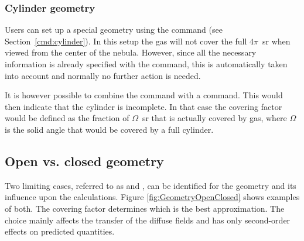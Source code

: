 \subsubsection{Cylinder geometry}
\label{cov_cylinder}

Users can set up a special geometry using the  command
(see Section~\ref{cmd:cylinder}). In this setup the gas will not cover the
full $4\pi$~sr when viewed from the center of the nebula. However, since all
the necessary information is already specified with the 
command, this is automatically taken into account and normally no further
action is needed.

It is however possible to combine the  command with a
 command. This would then indicate that the
cylinder is incomplete. In that case the covering factor would be defined as
the fraction of $\Omega$~sr that is actually covered by gas, where $\Omega$
is the solid angle that would be covered by a full cylinder.

\subsection{Open vs. closed geometry}
\label{sec:GeometryOpenClosed}

Two limiting cases, referred to as  and , can be identified
for the geometry and its influence upon the calculations.
Figure \ref{fig:GeometryOpenClosed} shows
examples of both.
The covering factor determines which is the best
approximation.
The choice mainly affects the transfer of the diffuse fields
and has only second-order effects on predicted quantities.

